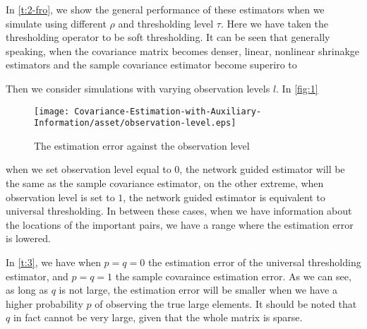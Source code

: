 

In \autoref{t:2-fro}, we show the general performance of these estimators when we simulate using different \(\rho\) and thresholding level \(\tau\). Here we have taken the thresholding operator to be soft thresholding. It can be seen that generally speaking, when the covariance matrix becomes denser, linear, nonlinear shrinakge estimators and the sample covariance estimator become superiro to 

Then we consider simulations with varying observation levels \(l\). In \autoref{fig:1}
\begin{figure}[htbp]
     \centering
     \texttt{[image: Covariance-Estimation-with-Auxiliary-Information/asset/observation-level.eps]}
     \caption{The estimation error against the observation level}
     \label{fig:1}
\end{figure}
when we set observation level equal to \(0\), the network guided estimator will be the same as the sample covariance estimator, on the other extreme, when observation level is set to \(1\), the network guided estimator is equivalent to universal thresholding. In between these cases, when we have information about the locations of the important pairs, we have a range where the estimation error is lowered. 



In \autoref{t:3}, we have when \(p = q = 0\) the estimation error of the universal thresholding estimator, and \(p =q =1\) the sample covaraince estimation error. As we can see, as long as \(q\) is not large, the estimation error will be smaller when we have a higher probability \(p\) of observing the true large elements. It should be noted that \(q\) in fact cannot be very large, given that the whole matrix is sparse. 


